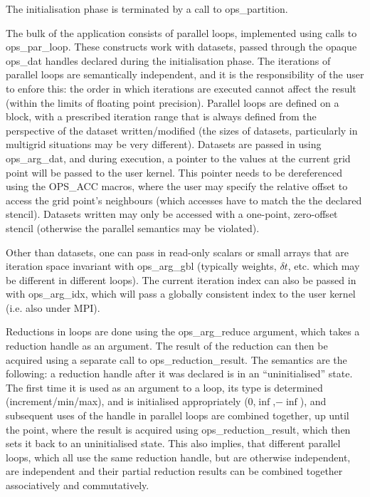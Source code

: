 \documentclass[11pt]{article}
\begin{document}
The initialisation phase is terminated by a call to ops\_partition.

The bulk of the application consists of parallel loops, implemented using calls to ops\_par\_loop. These constructs work with datasets, passed through the opaque ops\_dat handles declared during the initialisation phase. The iterations of parallel loops are semantically independent, and it is the responsibility of the user to enfore this: the order in which iterations are executed cannot affect the result (within the limits of floating point precision). Parallel loops are defined on a block, with a prescribed iteration range that is always defined from the perspective of the dataset written/modified (the sizes of datasets, particularly in multigrid situations may be very different). Datasets are passed in using ops\_arg\_dat, and during execution, a pointer to the values at the current grid point will be passed to the user kernel. This pointer needs to be dereferenced using the OPS\_ACC macros, where the user may specify the relative offset to access the grid point's neighbours (which accesses have to match the the declared stencil). Datasets written may only be accessed with a one-point, zero-offset stencil (otherwise the parallel semantics may be violated).

Other than datasets, one can pass in read-only scalars or small arrays that are iteration space invariant with ops\_arg\_gbl (typically weights, $\delta t$, etc. which may be different in different loops). The current iteration index can also be passed in with ops\_arg\_idx, which will pass a globally consistent index to the user kernel (i.e. also under MPI).

Reductions in loops are done using the ops\_arg\_reduce argument, which takes a reduction handle as an argument. The result of the reduction can then be acquired using a separate call to ops\_reduction\_result. The semantics are the following: a reduction handle after it was declared is in an ``uninitialised'' state. The first time it is used as an argument to a loop, its type is determined (increment/min/max), and is initialised appropriately (0,$\inf$,$-\inf$), and subsequent uses of the handle in parallel loops are combined together, up until the point, where the result is acquired using ops\_reduction\_result, which then sets it back to an uninitialised state. This also implies, that different parallel loops, which all use the same reduction handle, but are otherwise independent, are independent and their partial reduction results can be combined together associatively and commutatively. 
\end{document}
